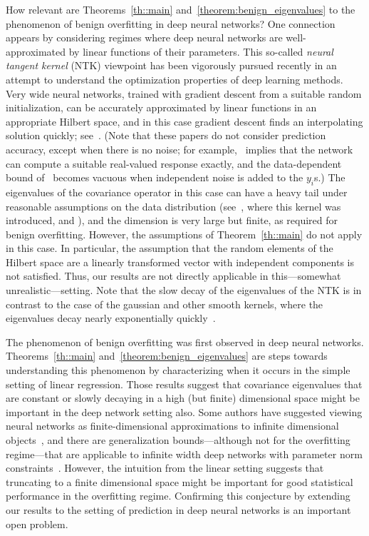 \documentclass[11pt,notitlepage]{article}
\begin{document}
How relevant are Theorems~\ref{th::main}
and~\ref{theorem:benign_eigenvalues} to the phenomenon of benign
overfitting in deep neural networks?  One connection appears by
considering regimes where deep neural networks are well-approximated
by linear functions of their parameters. This so-called {\em
neural tangent kernel} (NTK) viewpoint has been vigorously pursued
recently in an attempt to understand the optimization properties
of deep learning methods.  Very wide neural networks, trained
with gradient descent from a suitable random initialization,
can be accurately approximated by linear functions in an
appropriate Hilbert space, and in this case gradient descent
finds an interpolating solution quickly; see~\cite{ll-lonnsgdsd-18,%
dpzs-gdpoopnn-18,dllwz-gdfgmdnn-18,zou2018stochastic,jgh-ntkcgnn-18,%
adhlw-fgaogotlnn-19}.
(Note that these papers do not consider prediction
accuracy, except when there is no noise; for
example,~\cite[Assumption~A1]{ll-lonnsgdsd-18} implies that the
network can compute a suitable real-valued response exactly, and
the data-dependent bound of~\cite[Theorem~5.1]{adhlw-fgaogotlnn-19}
becomes vacuous when independent noise is added to the $y_i$s.) The
eigenvalues of the covariance operator in this case can have a
heavy tail under reasonable assumptions on the data distribution
(see~\cite{xls-dnnlttf-16}, where this kernel was introduced,
and \cite{cao2019towards}),
and the dimension is very large but
finite, as required for benign overfitting. 
However, the assumptions
of Theorem~\ref{th::main} do not apply in this case. In particular,
the assumption that the random elements of the Hilbert space are
a linearly transformed vector with independent components is not
satisfied. Thus, our results are not directly applicable in
this---somewhat unrealistic---setting.
Note that the slow decay of the eigenvalues of the NTK is in contrast
to the case of the gaussian and other smooth kernels, where the
eigenvalues decay nearly exponentially
quickly~\cite{DBLP:conf/colt/Belkin18}.

The phenomenon of benign overfitting was first observed
in deep neural networks.
Theorems~\ref{th::main} and~\ref{theorem:benign_eigenvalues}
are steps towards understanding this phenomenon by
characterizing when it occurs in the simple setting of linear
regression. Those results suggest that covariance eigenvalues that are
constant or slowly decaying in a high (but finite)
dimensional space might be important in the deep network setting also.
Some authors have suggested viewing neural networks as
finite-dimensional approximations to infinite dimensional objects~\cite{lbw-ealnnbf-96,blvdm-cnn-06,b-bcdcnn-17}, and there are
generalization bounds---although not for the overfitting regime---that
are applicable to infinite width deep networks with parameter norm
constraints~\cite{b-scpcnn-98,bm-rgcrbsr-02,nts-nbccnn-15,snmbnn-manng-17,%
grs-siscnn-18}.
However, the intuition from the linear setting suggests
that truncating to a finite dimensional space might be important
for good statistical performance in the overfitting regime.
Confirming this conjecture by extending our results to the setting
of prediction in deep neural networks is an important open problem.
\end{document}
